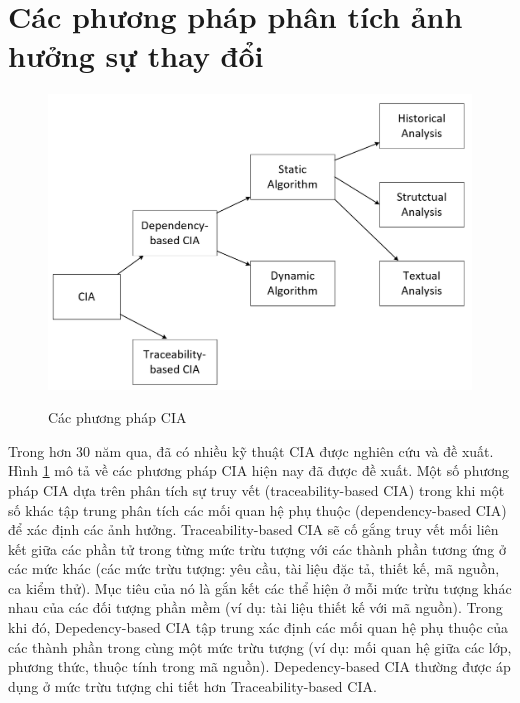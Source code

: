 \documentclass[12pt,a4paper]{report}
\begin{document}
\section{Các phương pháp phân tích ảnh hưởng sự thay đổi}
\begin{figure}[h]
	\centering
	\includegraphics[scale=0.5]{CIA-hierarchy}
	\label{fig:cia-hierarchy}
	\caption{Các phương pháp CIA}
\end{figure}

Trong hơn 30 năm qua, đã có nhiều kỹ thuật CIA được nghiên cứu và đề xuất. Hình \ref{fig:cia-hierarchy} mô tả về các phương pháp CIA hiện nay đã được đề xuất. Một số phương pháp CIA dựa trên phân tích sự truy vết (traceability-based CIA) trong khi một số khác tập trung phân tích các mối quan hệ phụ thuộc (dependency-based CIA) để xác định các ảnh hưởng. Traceability-based CIA sẽ cố gắng truy vết mối liên kết giữa các phần tử trong từng mức trừu tượng với các thành phần tương ứng ở các mức khác (các mức trừu tượng: yêu cầu, tài liệu đặc tả, thiết kế, mã nguồn, ca kiểm thử). Mục tiêu của nó là gắn kết các thể hiện ở mỗi mức trừu tượng khác nhau của các đối tượng phần mềm (ví dụ: tài liệu thiết kế với mã nguồn). Trong khi đó, Depedency-based CIA tập trung xác định các mối quan hệ phụ thuộc của các thành phần trong cùng một mức trừu tượng (ví dụ: mối quan hệ giữa các lớp, phương thức, thuộc tính trong mã nguồn). Depedency-based CIA thường được áp dụng ở mức trừu tượng chi tiết hơn Traceability-based CIA.\\
\end{document}
